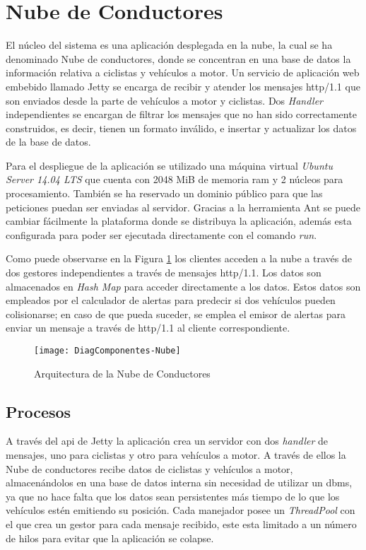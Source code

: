 \section{Nube de Conductores}\label{section:NubeConductores}
El núcleo del sistema es una aplicación desplegada en la nube, la cual se ha
denominado Nube de conductores, donde se concentran en una base de datos la
información relativa a ciclistas y vehículos a motor. Un servicio de aplicación
web embebido llamado Jetty se encarga de recibir y atender los mensajes
\Gls{http/1.1} que son enviados desde la parte de vehículos a motor y
ciclistas. Dos \emph{Handler} independientes se encargan de filtrar los
mensajes que no han sido correctamente construidos, es decir, tienen un formato
inválido, e insertar y actualizar los datos de la base de datos.

Para el despliegue de la aplicación se utilizado una máquina virtual
\emph{Ubuntu Server 14.04 LTS} que cuenta con 2048 MiB de memoria \gls{ram} y 2
núcleos para procesamiento. También se ha reservado un dominio público para que
las peticiones puedan ser enviadas al servidor. Gracias a la herramienta Ant se
puede cambiar fácilmente la plataforma donde se distribuya la aplicación,
además esta configurada para poder ser ejecutada directamente con el comando
\emph{run}.

Como puede observarse en la Figura \ref{fig:DiagComponentes-Nube} los clientes
acceden a la nube a través de dos gestores independientes a través de mensajes
\Gls{http/1.1}. Los datos son almacenados en \emph{Hash Map} para acceder
directamente a los datos. Estos datos son empleados por el calculador de
alertas para predecir si dos vehículos pueden colisionarse; en caso de que
pueda suceder, se emplea el emisor de alertas para enviar un mensaje a través
de \Gls{http/1.1} al cliente correspondiente.

\begin{figure}[H]
	\begin{center}
		\texttt{[image: DiagComponentes-Nube]}
		\caption{Arquitectura de la Nube de Conductores}
		\label{fig:DiagComponentes-Nube}
	\end{center}
\end{figure}

\subsection{Procesos}\label{ssection:procesos}
A través del \gls{api} de Jetty la aplicación crea un servidor con dos
\emph{handler} de mensajes, uno para ciclistas y otro para vehículos a motor. A
través de ellos la Nube de conductores recibe datos de ciclistas y vehículos a
motor, almacenándolos en una base de datos interna sin necesidad de utilizar un
\gls{dbms}, ya que no hace falta que los datos sean persistentes más tiempo de
lo que los vehículos estén emitiendo su posición. Cada manejador posee un
\emph{ThreadPool} con el que crea un gestor para cada mensaje recibido, este
esta limitado a un número de hilos para evitar que la aplicación se colapse.

